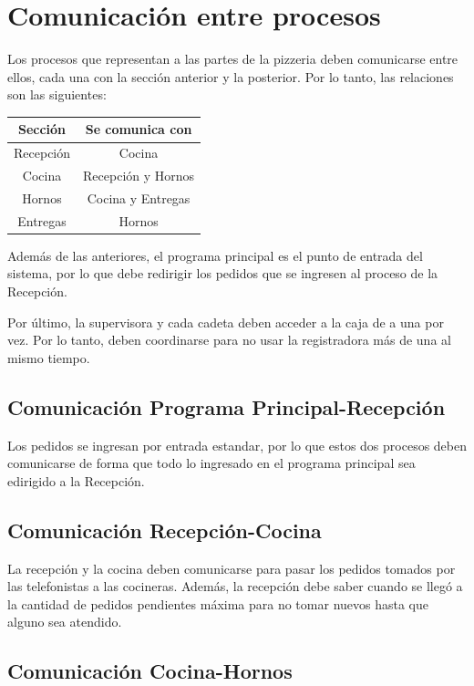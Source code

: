 \documentclass[11pt,spanish,a4paper,openany,notitlepage]{article}
\begin{document}
\section{Comunicación entre procesos}

Los procesos que representan a las partes de la pizzeria deben comunicarse entre ellos, cada una 
con la sección anterior y la posterior. Por lo tanto, las relaciones son las siguientes:

\begin{center}
\begin{tabular}{|c|c|}
\hline
Sección & Se comunica con \\
\hline
Recepción & Cocina \\
\hline
Cocina & Recepción y Hornos \\
\hline
Hornos & Cocina y Entregas \\
\hline
Entregas & Hornos \\
\hline
\end{tabular}
\end{center}

Además de las anteriores, el programa principal es el punto de entrada del sistema, por lo que debe 
redirigir los pedidos que se ingresen al proceso de la Recepción. 

Por último, la supervisora y cada cadeta deben acceder a la caja de a una por vez. Por lo tanto, 
deben coordinarse para no usar la registradora más de una al mismo tiempo.

\subsection{Comunicación Programa Principal-Recepción}

Los pedidos se ingresan por entrada estandar, por lo que estos dos procesos deben comunicarse de 
forma que todo lo ingresado en el programa principal sea edirigido a la Recepción. 

\subsection{Comunicación Recepción-Cocina}

La recepción y la cocina deben comunicarse para pasar los pedidos tomados por las telefonistas a 
las cocineras. Además, la recepción debe saber cuando se llegó a la cantidad de pedidos pendientes 
máxima para no tomar nuevos hasta que alguno sea atendido.

\subsection{Comunicación Cocina-Hornos}
\end{document}
